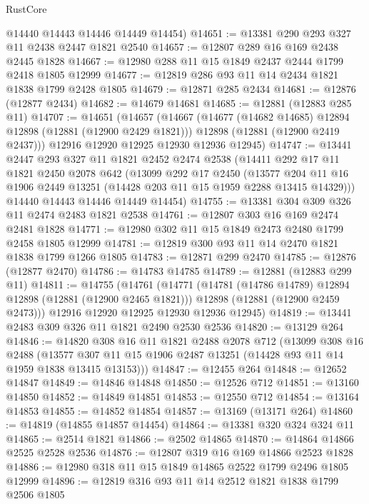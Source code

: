 \begin{lexlean}{RustCore}
\begin{coremodule}
      @14440
      @14443
      @14446
      @14449
      @14454)
@14651 := @13381 @290 @293 @327 @11 @2438 @2447 @1821 @2540
@14657 := @12807 @289 @16 @169 @2438 @2445 @1828
@14667 := @12980 @288 @11 @15 @1849 @2437 @2444 @1799 @2418 @1805 @12999
@14677 := @12819 @286 @93 @11 @14 @2434 @1821 @1838 @1799 @2428 @1805
@14679 := @12871 @285 @2434
@14681 := @12876 (@12877 @2434)
@14682 := @14679 @14681
@14685 := @12881 (@12883 @285 @11)
@14707 := @14651
    (@14657
      (@14667
        (@14677 (@14682 @14685) @12894 @12898 (@12881 (@12900 @2429 @1821)))
        @12898
        (@12881 (@12900 @2419 @2437)))
      @12916
      @12920
      @12925
      @12930
      @12936
      @12945)
@14747 := @13441
    @2447
    @293
    @327
    @11
    @1821
    @2452
    @2474
    @2538
    (@14411
      @292
      @17
      @11
      @1821
      @2450
      @2078
      @642
      (@13099
        @292
        @17
        @2450
        (@13577 @204 @11 @16 @1906 @2449 @13251 (@14428 @203 @11 @15 @1959 @2288 @13415 @14329)))
      @14440
      @14443
      @14446
      @14449
      @14454)
@14755 := @13381 @304 @309 @326 @11 @2474 @2483 @1821 @2538
@14761 := @12807 @303 @16 @169 @2474 @2481 @1828
@14771 := @12980 @302 @11 @15 @1849 @2473 @2480 @1799 @2458 @1805 @12999
@14781 := @12819 @300 @93 @11 @14 @2470 @1821 @1838 @1799 @1266 @1805
@14783 := @12871 @299 @2470
@14785 := @12876 (@12877 @2470)
@14786 := @14783 @14785
@14789 := @12881 (@12883 @299 @11)
@14811 := @14755
    (@14761
      (@14771
        (@14781 (@14786 @14789) @12894 @12898 (@12881 (@12900 @2465 @1821)))
        @12898
        (@12881 (@12900 @2459 @2473)))
      @12916
      @12920
      @12925
      @12930
      @12936
      @12945)
@14819 := @13441 @2483 @309 @326 @11 @1821 @2490 @2530 @2536
@14820 := @13129 @264
@14846 := @14820
    @308
    @16
    @11
    @1821
    @2488
    @2078
    @712
    (@13099
      @308
      @16
      @2488
      (@13577 @307 @11 @15 @1906 @2487 @13251 (@14428 @93 @11 @14 @1959 @1838 @13415 @13153)))
@14847 := @12455 @264
@14848 := @12652 @14847
@14849 := @14846 @14848
@14850 := @12526 @712
@14851 := @13160 @14850
@14852 := @14849 @14851
@14853 := @12550 @712
@14854 := @13164 @14853
@14855 := @14852 @14854
@14857 := @13169 (@13171 @264)
@14860 := @14819 (@14855 @14857 @14454)
@14864 := @13381 @320 @324 @324 @11
@14865 := @2514 @1821
@14866 := @2502 @14865
@14870 := @14864 @14866 @2525 @2528 @2536
@14876 := @12807 @319 @16 @169 @14866 @2523 @1828
@14886 := @12980 @318 @11 @15 @1849 @14865 @2522 @1799 @2496 @1805 @12999
@14896 := @12819 @316 @93 @11 @14 @2512 @1821 @1838 @1799 @2506 @1805

\end{coremodule}
\end{lexlean}
